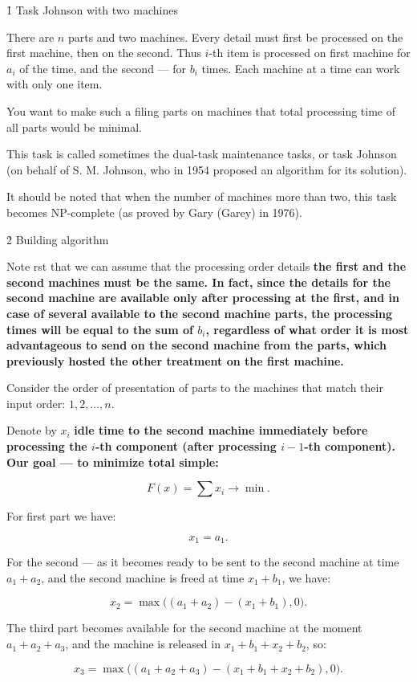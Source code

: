 \h1{ Task Johnson with two machines }

There are $n$ parts and two machines. Every detail must first be processed on the first machine, then on the second. Thus $i$-th item is processed on first machine for $a_i$ of the time, and the second --- for $b_i$ times. Each machine at a time can work with only one item.

You want to make such a filing parts on machines that total processing time of all parts would be minimal.

This task is called sometimes the dual-task maintenance tasks, or task Johnson (on behalf of S. M. Johnson, who in 1954 proposed an algorithm for its solution).

It should be noted that when the number of machines more than two, this task becomes NP-complete (as proved by Gary (Garey) in 1976).


\h2{ Building algorithm }

Note rst that we can assume that the processing order details \bf{the first and the second machines must be the same}. In fact, since the details for the second machine are available only after processing at the first, and in case of several available to the second machine parts, the processing times will be equal to the sum of $b_i$, regardless of what order it is most advantageous to send on the second machine from the parts, which previously hosted the other treatment on the first machine.

Consider the order of presentation of parts to the machines that match their input order: $1, 2, \ldots, n$.

Denote by $x_i$ \bf{idle time} to the second machine immediately before processing the $i$-th component (after processing $i-1$-th component). Our goal --- \bf{to minimize total simple}:

$$ F(x) = \sum x_i \longrightarrow \min. $$

For first part we have:

$$ x_1 = a_1. $$

For the second --- as it becomes ready to be sent to the second machine at time $a_1+a_2$, and the second machine is freed at time $x_1 + b_1$, we have:

$$ x_2 = \max \Big( (a_1+a_2) - (x_1+b_1), 0 \Big). $$

The third part becomes available for the second machine at the moment $a_1+a_2+a_3$, and the machine is released in $x_1+b_1+x_2+b_2$, so:

$$ x_3 = \max \Big( (a_1+a_2+a_3) - (x_1+b_1+x_2+b_2), 0 \Big). $$

